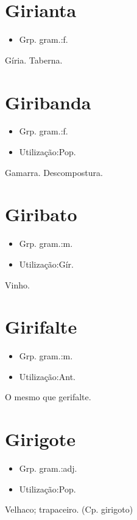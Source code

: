 \section{Girianta}
\begin{itemize}
\item {Grp. gram.:f.}
\end{itemize}
Gíria.
Taberna.
\section{Giribanda}
\begin{itemize}
\item {Grp. gram.:f.}
\end{itemize}
\begin{itemize}
\item {Utilização:Pop.}
\end{itemize}
Gamarra.
Descompostura.
\section{Giribato}
\begin{itemize}
\item {Grp. gram.:m.}
\end{itemize}
\begin{itemize}
\item {Utilização:Gír.}
\end{itemize}
Vinho.
\section{Girifalte}
\begin{itemize}
\item {Grp. gram.:m.}
\end{itemize}
\begin{itemize}
\item {Utilização:Ant.}
\end{itemize}
O mesmo que \textunderscore gerifalte\textunderscore .
\section{Girigote}
\begin{itemize}
\item {Grp. gram.:adj.}
\end{itemize}
\begin{itemize}
\item {Utilização:Pop.}
\end{itemize}
Velhaco; trapaceiro.
(Cp. \textunderscore girigoto\textunderscore )
